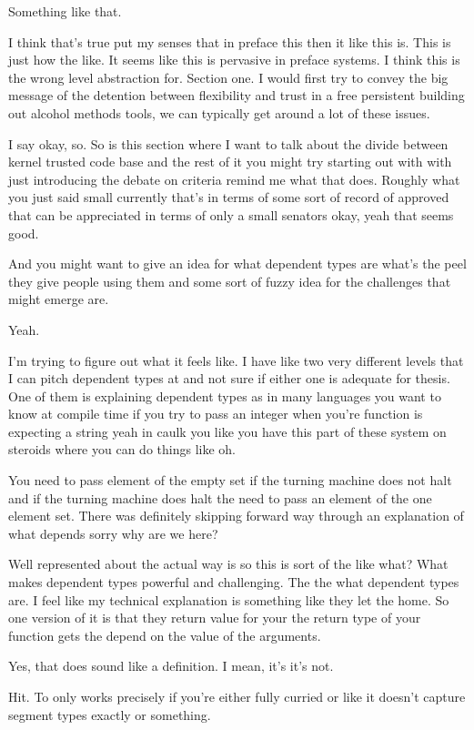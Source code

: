 \begin{subappendices}
Something like that.

I think that's true put my senses that in preface this then it like this is. This is just how the like. It seems like this is pervasive in preface systems. I think this is the wrong level abstraction for. Section one. I would first try to convey the big message of the detention between flexibility and trust in a free persistent building out alcohol methods tools, we can typically get around a lot of these issues.

I say okay, so. So is this section where I want to talk about the divide between kernel trusted code base and the rest of it you might try starting out with with just introducing the debate on criteria remind me what that does. Roughly what you just said small currently that's in terms of some sort of record of approved that can be appreciated in terms of only a small senators okay, yeah that seems good.

And you might want to give an idea for what dependent types are what's the peel they give people using them and some sort of fuzzy idea for the challenges that might emerge are.

Yeah.

I'm trying to figure out what it feels like. I have like two very different levels that I can pitch dependent types at and not sure if either one is adequate for thesis. One of them is explaining dependent types as in many languages you want to know at compile time if you try to pass an integer when you're function is expecting a string yeah in caulk you like you have this part of these system on steroids where you can do things like oh.

You need to pass element of the empty set if the turning machine does not halt and if the turning machine does halt the need to pass an element of the one element set. There was definitely skipping forward way through an explanation of what depends sorry why are we here?

Well represented about the actual way is so this is sort of the like what? What makes dependent types powerful and challenging. The the what dependent types are. I feel like my technical explanation is something like they let the home. So one version of it is that they return value for your the return type of your function gets the depend on the value of the arguments.

Yes, that does sound like a definition. I mean, it's it's not.

Hit. To only works precisely if you're either fully curried or like it doesn't capture segment types exactly or something.


\end{subappendices}
